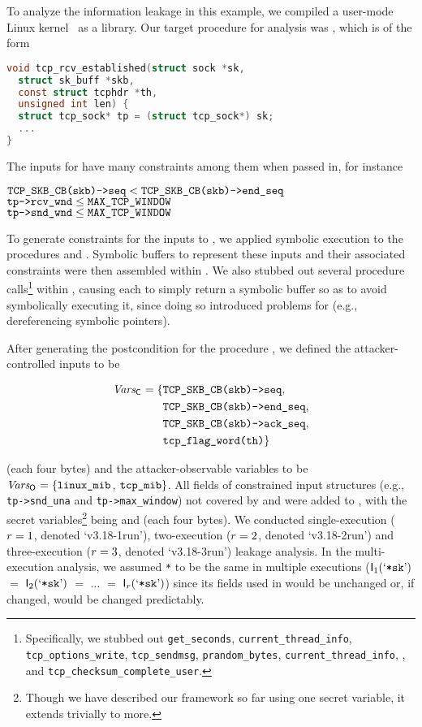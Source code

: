 To analyze the information leakage in this example, we compiled a
user-mode Linux kernel~\cite{dike2001user} as a library.  Our target
procedure for analysis was \tcprcvfunc, which is of the form
\begin{lstlisting}[language=c,basicstyle=\small\ttfamily,xleftmargin=0pt,xrightmargin=0pt]
void tcp_rcv_established(struct sock *sk,
  struct sk_buff *skb,
  const struct tcphdr *th,
  unsigned int len) {
  struct tcp_sock* tp = (struct tcp_sock*) sk;
  ...
}
\end{lstlisting}%
The inputs for \tcprcvfunc have many constraints among them
when passed in, for instance
\begin{center}
{\small
$\texttt{TCP\_SKB\_CB(skb)->seq}  < \texttt{TCP\_SKB\_CB(skb)->end\_seq}$\\
$\texttt{tp->rcv\_wnd}  \leq \texttt{MAX\_TCP\_WINDOW}$ \\
$\texttt{tp->snd\_wnd}  \leq \texttt{MAX\_TCP\_WINDOW}$
}
\end{center}
To generate constraints for the inputs to \tcprcvfunc, we applied
symbolic execution to the procedures \fillpkg and \tcpinitsock.
Symbolic buffers to represent these inputs and their associated
constraints were then assembled within
\tcprcvfunc.  We also stubbed out several procedure
calls\footnote{Specifically, we stubbed out \texttt{get\_seconds},
  \texttt{current\_thread\_info}, \texttt{tcp\_options\_write},
  \texttt{tcp\_sendmsg}, \texttt{prandom\_bytes},
  \texttt{current\_thread\_info}, \tcpparseoption, and
  \texttt{tcp\_checksum\_complete\_user}.}  within \tcprcvfunc,
causing each to simply return a symbolic buffer so as to avoid
symbolically executing it, since doing so introduced problems for
\klee (e.g., dereferencing symbolic pointers).

After generating the postcondition for the procedure \tcprcvfunc, we
defined the attacker-controlled inputs to be 

\parbox{\linewidth}{
	\small{
\begin{align*}
	\mathit{Vars_{\mathsf{C}_{}}}  = \{&\texttt{TCP\_SKB\_CB(skb)->seq}, \\
	&\texttt{TCP\_SKB\_CB(skb)->end\_seq}, \\
	&\texttt{TCP\_SKB\_CB(skb)->ack\_seq}, \\
	& \texttt{tcp\_flag\_word(th)}\}
\end{align*}
}}
(each four bytes) and the attacker-observable variables to be
$\mathit{Vars_{\mathsf{O}_{}}} = \{\texttt{linux\_mib}$, $\texttt{tcp\_mib}\}$.  All fields of constrained
input structures (e.g., \texttt{tp->snd\_una} and
\texttt{tp->max\_window}) not covered by \ACIKeys and \AOOKeys were
added to \AIIKeys, with the secret variables\footnote{Though we have
  described our framework so far using one secret variable, it extends
  trivially to more.} being \tcpseq and \tcpack (each four bytes).  We
conducted single-execution ($r=1$, denoted `v3.18-1run'),
two-execution ($r=2$, denoted `v3.18-2run') and
three-execution ($r=3$, denoted `v3.18-3run') leakage
analysis.  In the multi-execution analysis, we assumed \texttt{*\sk} to
be the same in multiple executions
($\mathsf{I}_{1}(\textrm{`}\texttt{*sk}\textrm{'})$ $=$
$\mathsf{I}_{2}(\textrm{`}\texttt{*sk}\textrm{'})$ $=$ $\ldots$ $=$
$\mathsf{I}_{r}(\textrm{`}\texttt{*sk}\textrm{'})$) since its fields
used in \tcprcvfunc would be unchanged or, if changed, would be
changed predictably.

